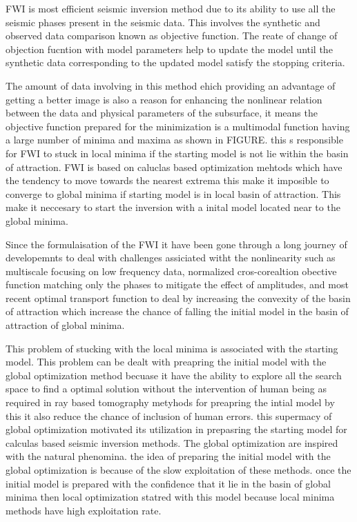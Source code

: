 \documentclass[paper,revised]{geophysics}
\begin{document}
FWI is most efficient seismic inversion method \citep{Pratt1999, Schuster2017, Tarantola1986, Virieux2009a} due to its ability to use all the seismic phases present in the seismic data. This involves the synthetic and observed data comparison \citep{Gomez2017, Liu2017, Metivier2018} known as objective function. The reate of change of objection fucntion with model parameters \citep{Plessix2006} help to update the model until the synthetic data corresponding to the updated model satisfy the stopping criteria. 
\par
The amount of data involving in this method ehich providing an advantage of getting a better image is also a reason for enhancing the nonlinear relation between the data and physical parameters of the subsurface, it means the objective function prepared for the minimization is a multimodal function having a large number of minima and maxima as shown in FIGURE. this s responsible for FWI to stuck in local minima if the starting model is not lie within the basin of attraction. FWI is based on caluclas based optimization mehtods which have the tendency to move towards the nearest extrema this make it imposible to converge to global minima if starting model is in local basin of attraction. This make it neccesary to start the inversion with a inital model located near to the global minima.
\par
Since the formulaisation of the FWI it have been gone through a long journey of developemnts to deal with challenges assiciated witht the nonlinearity such as multiscale focusing on low frequency data, normalized cros-corealtion obective function matching only the phases to mitigate the effect of amplitudes, and most recent optimal transport function to deal by increasing the convexity of the basin of attraction which increase the chance of falling the initial model in the basin of attraction of global minima. 
\par
This problem of stucking with the local minima is associated with the starting model. This problem can be dealt with preapring the initial model with the global optimization method becuase it have the ability to explore all the search space to find a optimal solution without the intervention of human being as required in ray based tomography metyhods for preapring the intial model by this it also reduce the chance of inclusion of human errors. this supermacy of global optimization motivated its utilization in prepasring the starting model for calculas based seismic inversion methods. The global optimization are inspired with the natural phenomina. the idea of preparing the initial model with the global optimization is because of the slow exploitation of these methods. once the initial model is prepared with the confidence that it lie in the basin of global minima then local optimization statred with this model because local minima methods have high exploitation rate.
\end{document}
